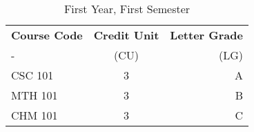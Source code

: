 \documentclass{article}
\begin{document}
	
\begin{table}[h!]
 \begin{center}
 	\caption{First Year, First Semester}
 	\label{tab:table1}
 	\begin{tabular}{l|c|r|}
 		\textbf{Course Code} & \textbf{Credit Unit} &
 		\textbf{Letter Grade}\\
 		- & (CU) & (LG)\\
 		\hline
 		CSC 101 & 3 & A\\
 		MTH 101 & 3 & B\\
 		CHM 101 & 3 & C\\
 	\end{tabular}
 \end{center}
\end{table}
\end{document}
